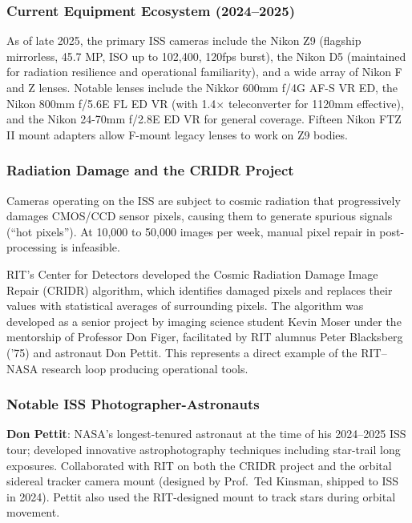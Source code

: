 \documentclass[11pt,letterpaper]{article}
\begin{document}
\subsubsection{Current Equipment Ecosystem (2024--2025)}

As of late 2025, the primary ISS cameras include the Nikon Z9 (flagship mirrorless, 45.7 MP, ISO up to 102,400, 120fps burst), the Nikon D5 (maintained for radiation resilience and operational familiarity), and a wide array of Nikon F and Z lenses. Notable lenses include the Nikkor 600mm f/4G AF-S VR ED, the Nikon 800mm f/5.6E FL ED VR (with 1.4$\times$ teleconverter for 1120mm effective), and the Nikon 24-70mm f/2.8E ED VR for general coverage. Fifteen Nikon FTZ II mount adapters allow F-mount legacy lenses to work on Z9 bodies.

\subsubsection{Radiation Damage and the CRIDR Project}

Cameras operating on the ISS are subject to cosmic radiation that progressively damages CMOS/CCD sensor pixels, causing them to generate spurious signals (``hot pixels''). At 10,000 to 50,000 images per week, manual pixel repair in post-processing is infeasible.

RIT's Center for Detectors developed the Cosmic Radiation Damage Image Repair (CRIDR) algorithm, which identifies damaged pixels and replaces their values with statistical averages of surrounding pixels. The algorithm was developed as a senior project by imaging science student Kevin Moser under the mentorship of Professor Don Figer, facilitated by RIT alumnus Peter Blacksberg ('75) and astronaut Don Pettit. This represents a direct example of the RIT--NASA research loop producing operational tools.

\subsubsection{Notable ISS Photographer-Astronauts}

\textbf{Don Pettit}: NASA's longest-tenured astronaut at the time of his 2024--2025 ISS tour; developed innovative astrophotography techniques including star-trail long exposures. Collaborated with RIT on both the CRIDR project and the orbital sidereal tracker camera mount (designed by Prof.\ Ted Kinsman, shipped to ISS in 2024). Pettit also used the RIT-designed mount to track stars during orbital movement.
\end{document}
